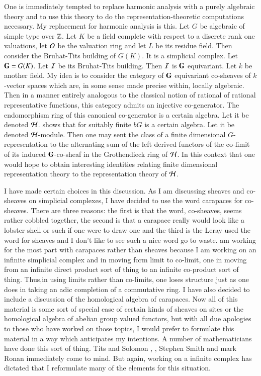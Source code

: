 One is immediately tempted to replace harmonic analysis with a purely algebraic theory and to use this theory to do the representation-theoretic computations necessary. My replacement for harmonic analysis is this. Let $G$ be algebraic of simple type over $\mathbb{Z}$. Let $K$ be a field complete with respect to a discrete rank one valuations, let $\mathcal{O}$ be the valuation ring and let $L$ be its residue field. Then consider the Bruhat-Tits building of $G(K)$. It is a simplicial complex. Let $\mathbf{G} =G(K)$. Let $\mathcal{I}$ be its Bruhat-Tits building. Then $\mathcal{I}$ is $\mathbf{G}$ equivariant. Let $k$ be another field. My idea is to consider the category of $\mathbf{G}$ equivariant co-sheaves of $k$-vector spaces which are, in some sense made precise within, locally algebraic. Then in a manner entirely analogous to the classical notion of rational of rational representative functions, this category admits an injective co-generator. The endomorphism ring of this canonical co-generator is a certain algebra. Let it be denoted $\mathcal{H}$. \cite{art6-keyT} shows that for suitably finite $bG$ is a certain algebra. Let it be denoted $\mathcal{H}$-module. Then one may sent the class of a finite dimensional $G$- representation to the alternating sum of the left derived functors of the co-limit of its induced $\mathbf{G}$-co-sheaf in the Grothendieck ring of $\mathcal{H}$. In this context that one would hope to obtain interesting identities relating finite dimensional representation theory to the representation theory of $\mathcal{H}$.

I have made certain choices in this discussion. As I am discussing sheaves and co-sheaves on simplicial complexes, I have decided to use the word carapaces for co-sheaves. There are three reasons: the first is that the word, co-sheaves, seems rather cobbled together, the second is that a carapace really would look like a lobster shell or such if one were to draw one and the third is the Leray used the word for sheaves and I don't like to see such a nice word go to waste.  am working for the most part with carapaces rather than sheaves because I am working on an infinite simplicial complex and in moving form limit to co-limit, one in moving from an infinite direct product sort of thing to an infinite co-product sort of thing. Thus,in using limits rather than co-limits, one loses structure just as one does in taking an adic completion of a commutative ring. I have also decided to include a discussion of the homological algebra of carapaces. Now all of this material is some sort of special case of certain kinds of sheaves on sites or the homological algebra of abelian group valued functors, but with all due apologies to those who have worked on those topics, I would prefer to formulate this material in a way which anticipates my intentions. A number of mathematicians have done this sort of thing. Tits and Solomon \cite{art6-keyS}, \cite{art6-keyT}, Stephen Smith and mark Ronan \cite{art6-keyRS} immediately come to mind. But again, working on a infinite complex has dictated that I reformulate many of the elements for this situation.

